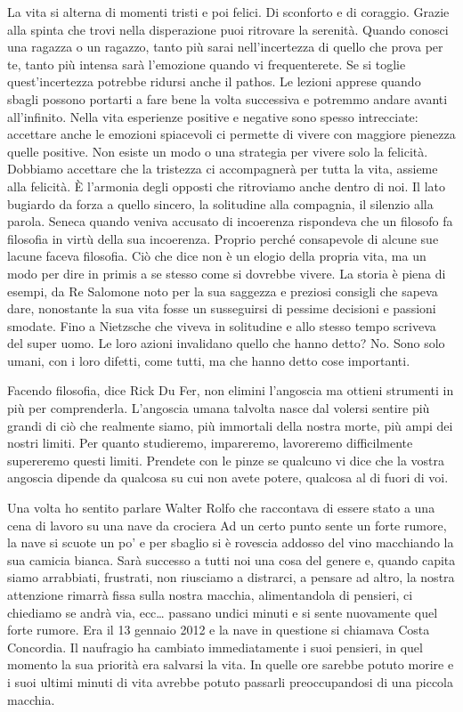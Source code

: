 \documentclass[12pt]{book} %
\begin{document}
La vita si alterna di momenti tristi e poi felici. Di sconforto e di coraggio. Grazie alla
spinta che trovi nella disperazione puoi ritrovare la serenità. Quando conosci una ragazza o un ragazzo, tanto più sarai
nell'incertezza di quello che prova per te, tanto più intensa sarà l'emozione
quando vi frequenterete. Se si toglie quest'incertezza potrebbe ridursi anche il pathos. 
Le lezioni apprese quando sbagli possono portarti a fare bene la volta successiva e potremmo andare avanti
all'infinito. 
Nella vita esperienze positive e negative sono spesso intrecciate: accettare anche le emozioni spiacevoli ci permette di vivere con maggiore pienezza quelle positive. Non esiste un
modo o una strategia per vivere solo la felicità. Dobbiamo accettare che la tristezza ci accompagnerà per tutta la vita, assieme
alla felicità. È l'armonia degli opposti che ritroviamo anche dentro di noi. 
Il lato bugiardo da forza a quello sincero, la
solitudine alla compagnia, il silenzio alla parola. Seneca quando veniva accusato di incoerenza rispondeva che un
filosofo fa filosofia in virtù della sua incoerenza. Proprio perché consapevole di alcune sue lacune faceva filosofia.
Ciò che dice non è un elogio della propria vita, ma un modo per dire in primis a se stesso come si dovrebbe vivere. La
storia è piena di esempi, da Re Salomone noto per la sua saggezza e preziosi consigli che sapeva dare, nonostante la
sua vita fosse un susseguirsi di pessime decisioni e passioni smodate. Fino a Nietzsche che viveva in solitudine e
allo stesso tempo scriveva del super uomo. Le loro azioni invalidano quello che hanno detto? No. Sono solo umani, con i
loro difetti, come tutti, ma che hanno detto cose importanti.

Facendo filosofia, dice Rick Du Fer, non elimini l'angoscia ma ottieni strumenti in più per comprenderla. L'angoscia
umana talvolta nasce dal volersi sentire più grandi di ciò che realmente siamo, più immortali della nostra morte, più ampi dei
nostri limiti. Per quanto studieremo, impareremo, lavoreremo difficilmente supereremo questi limiti. Prendete con le pinze se qualcuno
vi dice che la vostra angoscia dipende da qualcosa su cui non avete potere, qualcosa al di fuori di voi.

Una volta ho sentito parlare Walter Rolfo che raccontava di essere stato a una cena di lavoro su una nave da crociera Ad
un certo punto sente un forte rumore, la nave si scuote un po' e per sbaglio si è rovescia addosso del vino macchiando
la sua camicia bianca. Sarà successo a tutti noi una cosa del genere e, quando capita siamo arrabbiati, frustrati, non
riusciamo a distrarci, a pensare ad altro, la nostra attenzione rimarrà fissa sulla nostra macchia, alimentandola di
pensieri, ci chiediamo se andrà via, ecc… passano undici minuti e si sente nuovamente quel forte rumore. Era il 13
gennaio 2012 e la nave in questione si chiamava Costa Concordia. Il naufragio ha cambiato immediatamente i suoi
pensieri, in quel momento la sua priorità era salvarsi la vita. In quelle ore sarebbe potuto morire e i suoi ultimi
minuti di vita avrebbe potuto passarli preoccupandosi di una piccola macchia.
\end{document}
